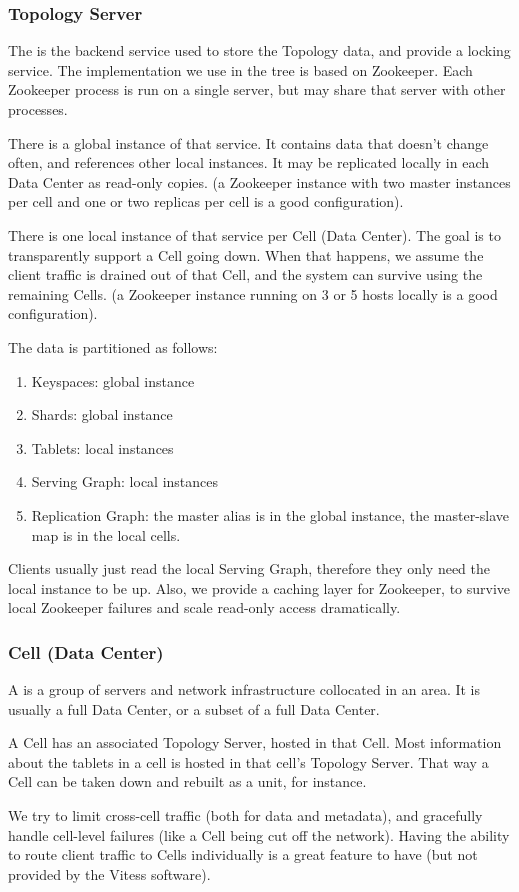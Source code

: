 \subsubsection{Topology Server}\label{topology-server}

The  is the backend service used to store the Topology data, and provide a locking service. The implementation we use in the tree is based on Zookeeper. Each Zookeeper process is run on a single server, but may share that server with other processes.

There is a global instance of that service. It contains data that doesn't change often, and references other local instances. It may be replicated locally in each Data Center as read-only copies. (a Zookeeper instance with two master instances per cell and one or two replicas per cell is a good configuration).

There is one local instance of that service per Cell (Data Center). The goal is to transparently support a Cell going down. When that happens, we assume the client traffic is drained out of that Cell, and the system can survive
using the remaining Cells. (a Zookeeper instance running on 3 or 5 hosts locally is a good configuration).

The data is partitioned as follows:
\begin{enumerate}
\item Keyspaces: global instance
\item Shards: global instance
\item Tablets: local instances
\item Serving Graph: local instances
\item Replication Graph: the master alias is in the global instance, the master-slave map is in the local cells.
\end{enumerate}


Clients usually just read the local Serving Graph, therefore they only need the local instance to be up. Also, we provide a caching layer for Zookeeper, to survive local Zookeeper failures and scale read-only access dramatically.

\subsubsection{Cell (Data Center)}\hypertarget{cell-data-center}{}\label{cell-data-center}

A  is a group of servers and network infrastructure collocated in an area. It is usually a full Data Center, or a subset of a full Data Center.

A Cell has an associated Topology Server, hosted in that Cell. Most information about the tablets in a cell is hosted in that cell's Topology Server. That way a Cell can be taken down and rebuilt as a unit, for instance.

We try to limit cross-cell traffic (both for data and metadata), and gracefully handle cell-level failures (like a Cell being cut off the network). Having the ability to route client traffic to Cells individually is a great feature to have (but not provided by the Vitess software).

